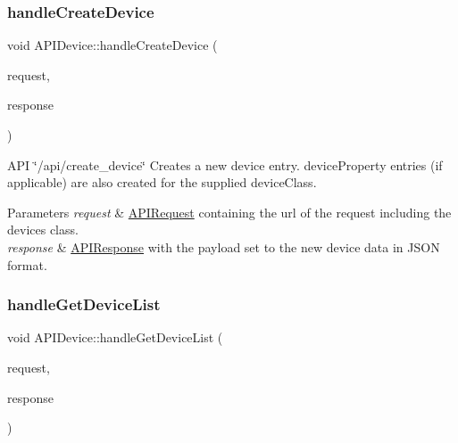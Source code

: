 \subsubsection{\texorpdfstring{handle\+Create\+Device}{handleCreateDevice}}
{\footnotesize\ttfamily void A\+P\+I\+Device\+::handle\+Create\+Device (\begin{DoxyParamCaption}\item[{const \hyperlink{class_a_p_i_request}{A\+P\+I\+Request} \&}]{request,  }\item[{\hyperlink{class_a_p_i_response}{A\+P\+I\+Response} $\ast$}]{response }\end{DoxyParamCaption})\hspace{0.3cm}{\ttfamily [slot]}}

A\+PI \char`\"{}/api/create\+\_\+device\char`\"{} Creates a new device entry. device\+Property entries (if applicable) are also created for the supplied device\+Class. 
\begin{DoxyParams}{Parameters}
{\em request} & \hyperlink{class_a_p_i_request}{A\+P\+I\+Request} containing the url of the request including the device\textquotesingle{}s class. \\
\hline
{\em response} & \hyperlink{class_a_p_i_response}{A\+P\+I\+Response} with the payload set to the new device data in J\+S\+ON format. \\
\hline
\end{DoxyParams}
\mbox{\label{class_a_p_i_device_a1e74a10d605557654fe5be02a9db87ab}} 
\subsubsection{\texorpdfstring{handle\+Get\+Device\+List}{handleGetDeviceList}}
{\footnotesize\ttfamily void A\+P\+I\+Device\+::handle\+Get\+Device\+List (\begin{DoxyParamCaption}\item[{const \hyperlink{class_a_p_i_request}{A\+P\+I\+Request} \&}]{request,  }\item[{\hyperlink{class_a_p_i_response}{A\+P\+I\+Response} $\ast$}]{response }\end{DoxyParamCaption})\hspace{0.3cm}{\ttfamily [slot]}}

